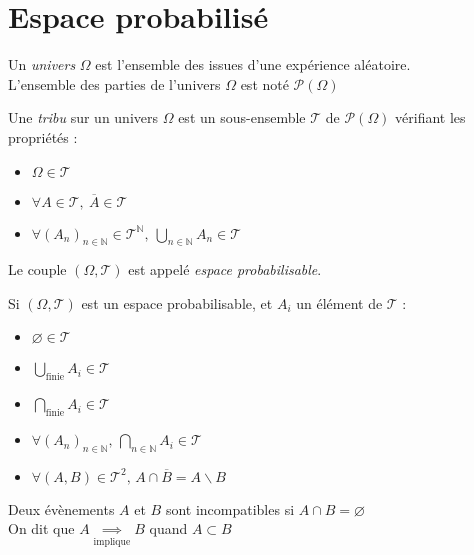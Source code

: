 \documentclass[11pt,a4paper,fleqn,pdftex]{report}
\begin{document}
\section{Espace probabilisé} %
\label{sec:espace_probabilise}
\begin{dfn}[Univers]
     Un \emph{univers} $\Omega$ est l'ensemble des issues d'une expérience aléatoire.\\
     L'ensemble des parties de l'univers $\Omega$ est noté $\mathcal{P}(\Omega{})$
\end{dfn}
\begin{dfn}[Tribu]
     Une \emph{tribu} sur un univers $\Omega$ est un sous-ensemble $\mathscr{T}$ de $\mathcal{P}(\Omega{})$ vérifiant les propriétés :
     \begin{itemize}
         \item $\Omega \in \mathscr{T}$
         \item $\forall A \in \mathscr{T},\: \overline{A} \in \mathscr{T}$
         \item $\forall \left( A_n \right)_{n\in \mathbb{N}} \in \mathscr{T}^\mathbb{N},\: \bigcup_{n\in \mathbb{N}} A_n \in \mathscr{T}$
     \end{itemize}
     Le couple $(\Omega, \mathscr{T})$ est appelé \emph{espace probabilisable}.
\end{dfn}
\begin{prop}
     Si $(\Omega, \mathscr{T})$ est un espace probabilisable, et $A_i$ un élément de $\mathscr{T}$ :
     \begin{itemize}
         \item $\varnothing \in \mathscr{T}$
         \item $\bigcup_\text{finie} A_i \in \mathscr{T}$
         \item $\bigcap_\text{finie} A_i \in \mathscr{T}$
         \item $\forall (A_n)_{n\in \mathbb{N}},\, \bigcap_{n\in \mathbb{N}} A_i \in \mathscr{T}$
         \item $\forall (A,B) \in \mathscr{T}^2,\, A\cap \overline{B} = A \backslash B$
     \end{itemize}
\end{prop}
\begin{dfn}
     Deux évènements $A$ et $B$ sont incompatibles si $A \cap B = \varnothing$\\
     On dit que $A \underset{\text{implique}}{\implies} B$ quand $A \subset B$
\end{dfn}
\end{document}
